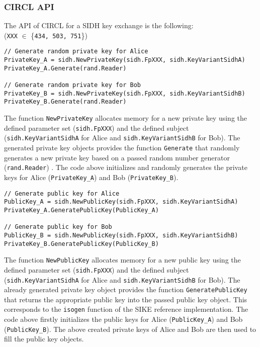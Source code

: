 \subsubsection{\gls{CIRCL} API}
The API of \gls{CIRCL} for a \gls{SIDH} key exchange is the following:\\
(\texttt{XXX} $\in$ \{\texttt{434, 503, 751}\})



\begin{lstlisting}[]
// Generate random private key for Alice
PrivateKey_A = sidh.NewPrivateKey(sidh.FpXXX, sidh.KeyVariantSidhA)
PrivateKey_A.Generate(rand.Reader)

// Generate random private key for Bob
PrivateKey_B = sidh.NewPrivateKey(sidh.FpXXX, sidh.KeyVariantSidhB)
PrivateKey_B.Generate(rand.Reader)
\end{lstlisting}
The function \texttt{NewPrivateKey} allocates memory for a new private key using the defined parameter set (\texttt{sidh.FpXXX}) and the defined subject (\texttt{sidh.KeyVariantSidhA} for Alice and \texttt{sidh.KeyVariantSidhB} for Bob). The generated private key objects provides the function \texttt{Generate} that randomly generates a new private key based on a passed random number generator (\texttt{rand.Reader}) .
The code above initializes and randomly generates the private keys for Alice (\textcolor{keywordcol}{\texttt{PrivateKey\_A}}) and Bob (\textcolor{keywordcol}{\texttt{PrivateKey\_B}}).\\

\begin{lstlisting}[]
// Generate public key for Alice
PublicKey_A = sidh.NewPublicKey(sidh.FpXXX, sidh.KeyVariantSidhA)
PrivateKey_A.GeneratePublicKey(PublicKey_A)

// Generate public key for Bob
PublicKey_B = sidh.NewPublicKey(sidh.FpXXX, sidh.KeyVariantSidhB)
PrivateKey_B.GeneratePublicKey(PublicKey_B)
\end{lstlisting}
The function \texttt{NewPublicKey} allocates memory for a new public key using the defined parameter set (\texttt{sidh.FpXXX}) and the defined subject (\texttt{sidh.KeyVariantSidhA} for Alice and \texttt{sidh.KeyVariantSidhB} for Bob). The already generated private key object provides the function \texttt{GeneratePublicKey} that returns the appropriate public key into the passed public key object. This corresponds to the \texttt{isogen} function of the SIKE reference implementation.
The code above firstly initializes the public keys for Alice (\textcolor{keywordcol}{\texttt{PublicKey\_A}}) and Bob (\textcolor{keywordcol}{\texttt{PublicKey\_B}}). The above created private keys of Alice and Bob are then used to fill the public key objects.\\


